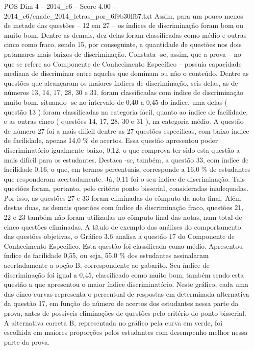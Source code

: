 \begin{textsample}{POS Dim 4 – 2014\_c6 – Score 4.00 – 2014\_c6/enade\_2014\_letras\_por\_6f9b30ff67.txt}
Assim, para um pouco menos de metade das questões – 12 em 27 – os índices de discriminação foram bom ou muito bom.
Dentre as demais, dez delas foram classificadas como médio e outras cinco como fraco, sendo 15, por conseguinte, a quantidade de questões nos dois patamares mais baixos de discriminação.
Constata -se, assim, que a prova – no que se refere ao Componente de Conhecimento Específico – possuía capacidade mediana de discriminar entre aqueles que dominam ou não o conteúdo.
Dentre as questões que alcançaram os maiores índices de discriminação, seis delas, as de números 13, 14, 17, 28, 30 e 31, foram classificadas com índice de discriminação muito bom, situando -se no intervalo de 0,40 a 0,45 do índice, uma delas ( questão 13 ) foram classificadas na categoria fácil, quanto ao índice de facilidade, e as outras cinco ( questões 14, 17, 28, 30 e 31 ), na categoria médio.
A questão de número 27 foi a mais difícil dentre as 27 questões específicas, com baixo índice de facilidade, apenas 14,0 \% de acertos.
Essa questão apresentou poder discriminatório igualmente baixo, 0,12, o que comprova ter sido esta questão a mais difícil para os estudantes.
Destaca -se, também, a questão 33, com índice de facilidade 0,16, o que, em termos percentuais, corresponde a 16,0 \% de estudantes que responderam acertadamente.
Já, 0,11 foi o seu índice de discriminação.
Tais questões foram, portanto, pelo critério ponto bisserial, consideradas inadequadas.
Por isso, as questões 27 e 33 foram eliminadas do cômputo da nota final.
Além destas duas, as demais questões com índice de discriminação fraco, questões 21, 22 e 23 também não foram utilizadas no cômputo final das notas, num total de cinco questões eliminadas.
A título de exemplo das análises do comportamento das questões objetivas, o Gráfico 3.6 analisa a questão 17 do Componente de Conhecimento Específico.
Esta questão foi classificada como médio.
Apresentou índice de facilidade 0,55, ou seja, 55,0 \% dos estudantes assinalaram acertadamente a opção B, correspondente ao gabarito.
Seu índice de discriminação foi igual a 0,45, classificado como muito bom, também sendo esta questão a que apresentou o maior índice discriminatório.
Neste gráfico, cada uma das cinco curvas representa o percentual de respostas em determinada alternativa da questão 17, em função do número de acertos dos estudantes nessa parte da prova, antes de possíveis eliminações de questões pelo critério do ponto bisserial.
A alternativa correta B, representada no gráfico pela curva em verde, foi escolhida em maiores proporções pelos estudantes com desempenho melhor nessa parte da prova.

\end{textsample}
